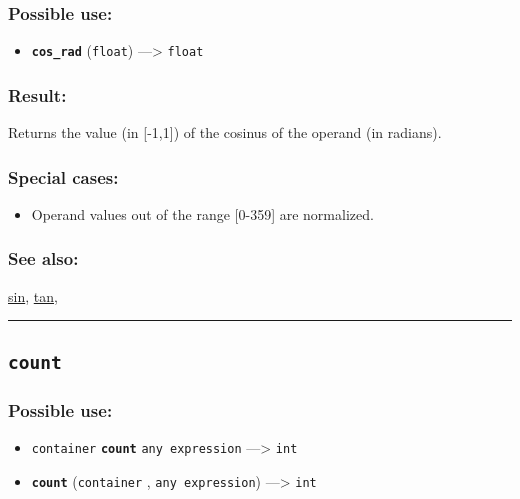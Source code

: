 \documentclass[]{book}
\providecommand{\tightlist}{%
  \setlength{\itemsep}{0pt}\setlength{\parskip}{0pt}}
\theoremstyle{definition}
\theoremstyle{definition}
\theoremstyle{definition}
\theoremstyle{remark}
\begin{document}
\subsubsection{Possible use:}\label{possible-use-111}

\begin{itemize}
\tightlist
\item
  \textbf{\texttt{cos\_rad}} (\texttt{float}) ---\textgreater{}
  \texttt{float}
\end{itemize}

\subsubsection{Result:}\label{result-108}

Returns the value (in {[}-1,1{]}) of the cosinus of the operand (in
radians).

\subsubsection{Special cases:}\label{special-cases-40}

\begin{itemize}
\tightlist
\item
  Operand values out of the range {[}0-359{]} are normalized.
\end{itemize}

\subsubsection{See also:}\label{see-also-68}

\href{OperatorsSZ\#sin}{sin}, \href{OperatorsSZ\#tan}{tan},

\begin{center}\rule{0.5\linewidth}{\linethickness}\end{center}

\subsection{\texorpdfstring{\texttt{count}}{count}}\label{count}

\subsubsection{Possible use:}\label{possible-use-112}

\begin{itemize}
\tightlist
\item
  \texttt{container} \textbf{\texttt{count}} \texttt{any\ expression}
  ---\textgreater{} \texttt{int}
\item
  \textbf{\texttt{count}} (\texttt{container} ,
  \texttt{any\ expression}) ---\textgreater{} \texttt{int}
\end{itemize}
\end{document}

